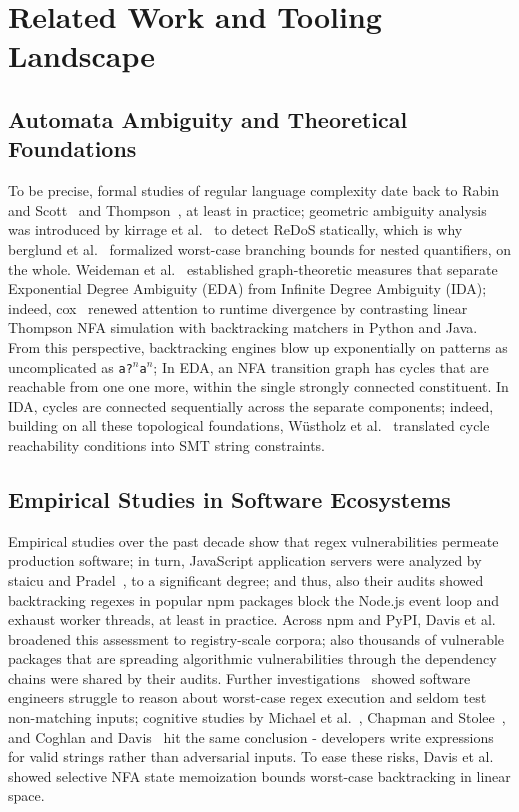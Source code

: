 \documentclass{ieeeaccess}
\begin{document}
\section{Related Work and Tooling Landscape}

\subsection{Automata Ambiguity and Theoretical Foundations}
To be precise, formal studies of regular language complexity date back to Rabin and Scott~\cite{rabin1959finite} and Thompson~\cite{thompson1968regular}, at least in practice; geometric ambiguity analysis was introduced by kirrage et al.~\cite{kirrage2013static} to detect ReDoS statically, which is why berglund et al.~\cite{berglund2014analyzing} formalized worst-case branching bounds for nested quantifiers, on the whole. Weideman et al.~\cite{weideman2016analyzing} established graph-theoretic measures that separate Exponential Degree Ambiguity (EDA) from Infinite Degree Ambiguity (IDA); indeed, cox~\cite{cox2007regular,cox2010regular} renewed attention to runtime divergence by contrasting linear Thompson NFA simulation with backtracking matchers in Python and Java. From this perspective, backtracking engines blow up exponentially on patterns as uncomplicated as \texttt{a?}$^n$\texttt{a}$^n$; In EDA, an NFA transition graph has cycles that are reachable from one one more, within the single strongly connected constituent. In IDA, cycles are connected sequentially across the separate components; indeed, building on all these topological foundations, W\"{u}stholz et al.~\cite{wustholz2017static} translated cycle reachability conditions into SMT string constraints.

\subsection{Empirical Studies in Software Ecosystems}
Empirical studies over the past decade show that regex vulnerabilities permeate production software; in turn, JavaScript application servers were analyzed by staicu and Pradel~\cite{staicu2018freezing}, to a significant degree; and thus, also their audits showed backtracking regexes in popular npm packages block the Node.js event loop and exhaust worker threads, at least in practice. Across npm and PyPI, Davis et al.~\cite{davis2018ecosystem,davis2019interview,davis2021memoization} broadened this assessment to registry-scale corpora; also thousands of vulnerable packages that are spreading algorithmic vulnerabilities through the dependency chains were shared by their audits. Further investigations~\cite{davis2019why,davis2019lingua} showed software engineers struggle to reason about worst-case regex execution and seldom test non-matching inputs; cognitive studies by Michael et al.~\cite{michael2019hard}, Chapman and Stolee~\cite{chapman2016exploring,stolee2016exploring}, and Coghlan and Davis~\cite{coghlan2021empirical} hit the same conclusion - developers write expressions for valid strings rather than adversarial inputs. To ease these risks, Davis et al.~\cite{davis2021memoization} showed selective NFA state memoization bounds worst-case backtracking in linear space.
\end{document}
